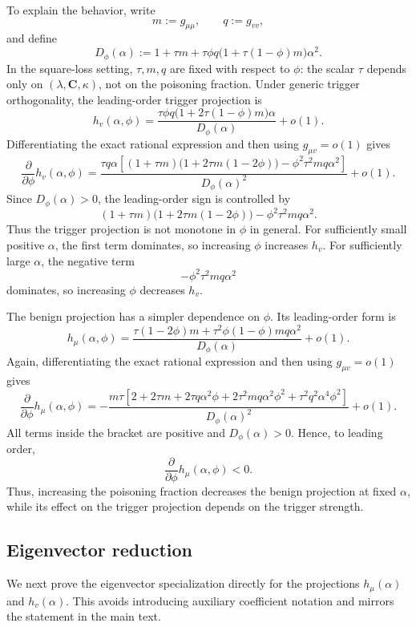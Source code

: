 \documentclass[11pt]{article}
\newcommand{\C}{\mathbf{C}}
\begin{document}
To explain the behavior, write
\[
m:=g_{\mu\mu},
\qquad
q:=g_{vv},
\]
and define
\[
D_\phi(\alpha)
:=
1+\tau m+\tau\phi q\bigl(1+\tau(1-\phi)m\bigr)\alpha^2 .
\]
In the square-loss setting, \(\tau,m,q\) are fixed with respect to \(\phi\):
the scalar \(\tau\) depends only on \((\lambda,\C,\kappa)\), not on the
poisoning fraction. Under generic trigger orthogonality, the leading-order
trigger projection is
\[
h_v(\alpha,\phi)
=
\frac{
\tau\phi q\bigl(1+2\tau(1-\phi)m\bigr)\alpha
}
{
D_\phi(\alpha)
}
+o(1).
\]
Differentiating the exact rational expression and then using
\(g_{\mu v}=o(1)\) gives
\[
\frac{\partial}{\partial\phi}
h_v(\alpha,\phi)
=
\frac{
\tau q\alpha
\left[
(1+\tau m)\bigl(1+2\tau m(1-2\phi)\bigr)
-
\phi^2\tau^2mq\alpha^2
\right]
}
{
D_\phi(\alpha)^2
}
+o(1).
\]
Since \(D_\phi(\alpha)>0\), the leading-order sign is controlled by
\[
(1+\tau m)\bigl(1+2\tau m(1-2\phi)\bigr)
-
\phi^2\tau^2mq\alpha^2 .
\]
Thus the trigger projection is not monotone in \(\phi\) in general. For
sufficiently small positive \(\alpha\), the first term dominates, so increasing
\(\phi\) increases \(h_v\). For sufficiently large \(\alpha\), the negative
term
\[
-\phi^2\tau^2mq\alpha^2
\]
dominates, so increasing \(\phi\) decreases \(h_v\).

The benign projection has a simpler dependence on \(\phi\). Its leading-order
form is
\[
h_\mu(\alpha,\phi)
=
\frac{
\tau(1-2\phi)m+\tau^2\phi(1-\phi)mq\alpha^2
}
{
D_\phi(\alpha)
}
+o(1).
\]
Again, differentiating the exact rational expression and then using
\(g_{\mu v}=o(1)\) gives
\[
\frac{\partial}{\partial\phi}
h_\mu(\alpha,\phi)
=
-
\frac{
m\tau
\left[
2+2\tau m
+2\tau q\alpha^2\phi
+2\tau^2mq\alpha^2\phi^2
+\tau^2q^2\alpha^4\phi^2
\right]
}
{
D_\phi(\alpha)^2
}
+o(1).
\]
All terms inside the bracket are positive and \(D_\phi(\alpha)>0\). Hence, to
leading order,
\[
\frac{\partial}{\partial\phi}h_\mu(\alpha,\phi)<0.
\]
Thus, increasing the poisoning fraction decreases the benign projection at fixed
\(\alpha\), while its effect on the trigger projection depends on the trigger
strength.

\subsection{Eigenvector reduction}

We next prove the eigenvector specialization directly for the projections
\(h_\mu(\alpha)\) and \(h_v(\alpha)\). This avoids introducing auxiliary
coefficient notation and mirrors the statement in the main text.
\end{document}
